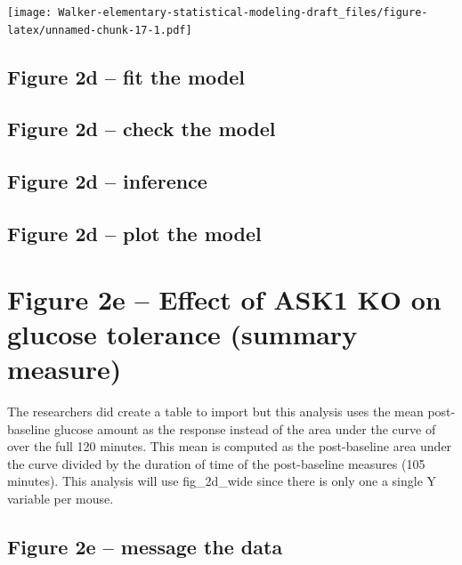 \documentclass[]{book}
\begin{document}
\texttt{[image: Walker-elementary-statistical-modeling-draft\_files/figure-latex/unnamed-chunk-17-1.pdf]}

\hypertarget{figure-2d-fit-the-model}{%
\subsection{Figure 2d -- fit the model}\label{figure-2d-fit-the-model}}

\hypertarget{figure-2d-check-the-model}{%
\subsection{Figure 2d -- check the model}\label{figure-2d-check-the-model}}

\hypertarget{figure-2d-inference}{%
\subsection{Figure 2d -- inference}\label{figure-2d-inference}}

\hypertarget{figure-2d-plot-the-model}{%
\subsection{Figure 2d -- plot the model}\label{figure-2d-plot-the-model}}

\hypertarget{figure-2e-effect-of-ask1-ko-on-glucose-tolerance-summary-measure}{%
\section{Figure 2e -- Effect of ASK1 KO on glucose tolerance (summary measure)}\label{figure-2e-effect-of-ask1-ko-on-glucose-tolerance-summary-measure}}

The researchers did create a table to import but this analysis uses the mean post-baseline glucose amount as the response instead of the area under the curve of over the full 120 minutes. This mean is computed as the post-baseline area under the curve divided by the duration of time of the post-baseline measures (105 minutes). This analysis will use fig\_2d\_wide since there is only one a single Y variable per mouse.

\hypertarget{figure-2e-message-the-data}{%
\subsection{Figure 2e -- message the data}\label{figure-2e-message-the-data}}
\end{document}

